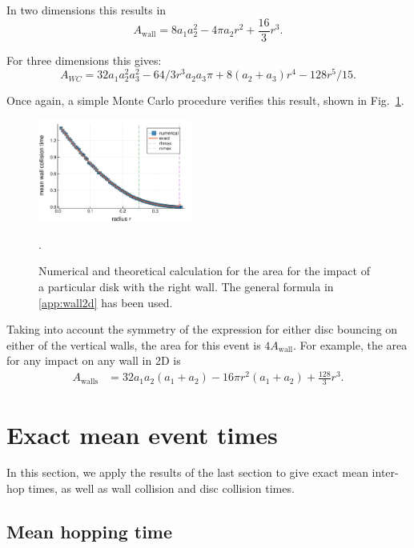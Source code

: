 \documentclass[superscriptaddress,pre,reprint,showpacs,twocolumn]{revtex4-1}
\begin{document}
In two dimensions this results in
\begin{equation}\label{areax1p}
 A_\mathrm{wall}  = 8 a_1 a_2 ^2-4  \pi a_2 r^2 +\frac{16}{3}r^3 .
\end{equation}

For three dimensions this gives:
\begin{equation}
  A_{WC}=32 a_1 a_2^2a_3^2 
  -64/3 r^3  a_2 a_3 \pi 
  +8(a_2+a_3)r^4
  -128 r^5/15.
\end{equation}

Once again, a simple Monte Carlo procedure verifies this result,
shown in Fig.~\ref{area1derecha}. 

\begin{figure}
\centering
\includegraphics[width=0.45\textwidth]{./figures/areawall01.pdf}
\caption{Numerical and theoretical calculation for the area
for the impact of a particular disk with the right wall.
The general formula in \ref{app:wall2d} has been used.}
\label{area1derecha}.
\end{figure}

Taking into account the symmetry of the expression for either disc
 bouncing on either of the vertical walls, the
area for this event is  $4A_\text{wall}$. 
For example, the area for any impact on any wall in 2D is
\begin{align}\label{areawalls}
 A_\text{walls} & = 32 a_1 a_2 (a_1+a_2)-16 \pi r^2 (a_1+a_2) +\frac{128}{3}r^3.
\end{align}


\section{Exact mean event times}

In this section, we apply the results of the last section to give
exact mean inter-hop times, as well as wall collision and disc collision times.


\subsection{Mean hopping time}
\end{document}

